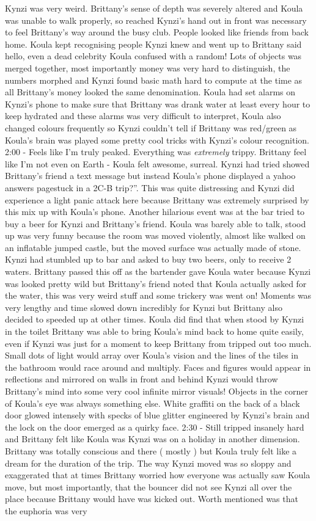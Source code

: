 \documentclass[12pt]{book}
\begin{document}
Kynzi was very weird. Brittany's sense of depth was severely altered and Koula was unable to walk properly, so reached Kynzi's hand out in front was necessary to feel Brittany's way around the busy club. People looked like friends from back home. Koula kept recognising people Kynzi knew and went up to Brittany said hello, even a dead celebrity Koula confused with a random! Lots of objects was merged together, most importantly money was very hard to distinguish, the numbers morphed and Kynzi found basic math hard to compute at the time as all Brittany's money looked the same denomination. Koula had set alarms on Kynzi's phone to make sure that Brittany was drank water at least every hour to keep hydrated and these alarms was very difficult to interpret, Koula also changed colours frequently so Kynzi couldn't tell if Brittany was red/green as Koula's brain was played some pretty cool tricks with Kynzi's colour recognition. 2:00 - Feels like I'm truly peaked. Everything was \emph{extremely} trippy. Brittany feel like I'm not even on Earth - Koula felt awesome, surreal. Kynzi had tried showed Brittany's friend a text message but instead Koula's phone displayed a yahoo answers pagestuck in a 2C-B trip?''. This was quite distressing and Kynzi did experience a light panic attack here because Brittany was extremely surprised by this mix up with Koula's phone. Another hilarious event was at the bar tried to buy a beer for Kynzi and Brittany's friend. Koula was barely able to talk, stood up was very funny because the room was moved violently, almost like walked on an inflatable jumped castle, but the moved surface was actually made of stone. Kynzi had stumbled up to bar and asked to buy two beers, only to receive 2 waters. Brittany passed this off as the bartender gave Koula water because Kynzi was looked pretty wild but Brittany's friend noted that Koula actually asked for the water, this was very weird stuff and some trickery was went on! Moments was very lengthy and time slowed down incredibly for Kynzi but Brittany also decided to speeded up at other times. Koula did find that when stood by Kynzi in the toilet Brittany was able to bring Koula's mind back to home quite easily, even if Kynzi was just for a moment to keep Brittany from tripped out too much. Small dots of light would array over Koula's vision and the lines of the tiles in the bathroom would race around and multiply. Faces and figures would appear in reflections and mirrored on walls in front and behind Kynzi would throw Brittany's mind into some very cool infinite mirror visuals! Objects in the corner of Koula's eye was always something else. White graffiti on the back of a black door glowed intensely with specks of blue glitter engineered by Kynzi's brain and the lock on the door emerged as a quirky face. 2:30 - Still tripped insanely hard and Brittany felt like Koula was Kynzi was on a holiday in another dimension. Brittany was totally conscious and there ( mostly ) but Koula truly felt like a dream for the duration of the trip. The way Kynzi moved was so sloppy and exaggerated that at times Brittany worried how everyone was actually saw Koula move, but most importantly, that the bouncer did not see Kynzi all over the place because Brittany would have was kicked out. Worth mentioned was that the euphoria was very 
\end{document}
